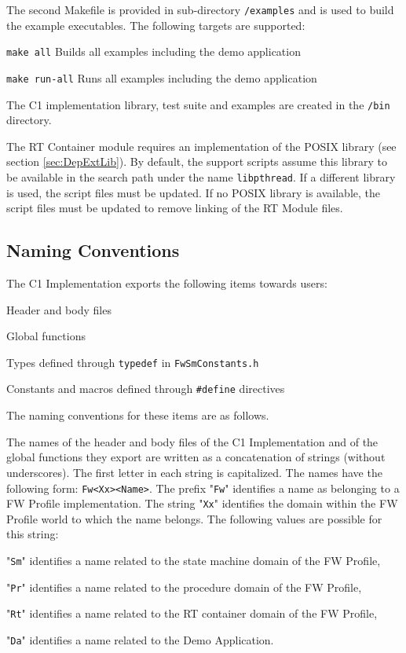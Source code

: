 \documentclass[a4paper,10pt]{article}
\newenvironment{fw_itemize}						%
{\begin{itemize}
  \setlength{\itemsep}{1mm}
  \setlength{\parskip}{0pt}
  \setlength{\parsep}{0pt}}
{\end{itemize}}
\begin{document}
The second Makefile is provided in sub-directory \texttt{/examples} and is used to build the example executables. The following targets are supported:
\begin{fw_itemize}
\item \texttt{make all} Builds all examples including the demo application
\item \texttt{make run-all} Runs all examples including the demo application
\end{fw_itemize}

The C1 implementation library, test suite and examples are created in the \texttt{/bin} directory.

The RT Container module requires an implementation of the POSIX library (see section \ref{sec:DepExtLib}). By default, the support scripts assume this library to be available in the search path under the name \texttt{libpthread}. If a different library is used, the script files must be updated. If no POSIX library is available, the script files must be updated to remove linking of the RT Module files. 

\subsection{Naming Conventions}
The C1 Implementation exports the following items towards users:

\begin{fw_itemize}
\item Header and body files
\item Global functions
\item Types defined through \texttt{typedef} in \texttt{FwSmConstants.h}
\item Constants and macros defined through \texttt{\#define} directives
\end{fw_itemize}

The naming conventions for these items are as follows.
 
The names of the header and body files of the C1 Implementation and of the global 
functions they export are written as a concatenation of strings (without underscores). 
The first letter in each string is capitalized. The names have the following form: 
\texttt{Fw<Xx><Name>}. The prefix "\texttt{Fw}" identifies a name as belonging to a FW Profile 
implementation. The string "\texttt{Xx}" identifies the domain within the FW Profile world 
to which the name belongs. The following values are possible for this string: 

\begin{fw_itemize}
\item "\texttt{Sm}" identifies a name related to the state machine domain of the FW Profile, 
\item "\texttt{Pr}" identifies a name related to the procedure domain of the FW Profile,  
\item "\texttt{Rt}" identifies a name related to the RT container domain of the FW Profile,  
\item "\texttt{Da}" identifies a name related to the Demo Application.
\end{fw_itemize}
\end{document}
